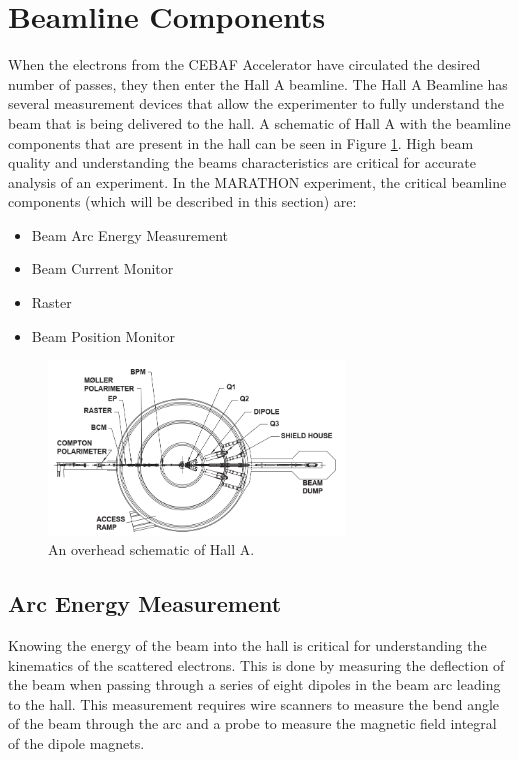 \section{Beamline Components}

When the electrons from the CEBAF Accelerator have circulated the desired number of passes, they then enter the Hall A beamline. The Hall A Beamline has several measurement devices that allow the experimenter to fully understand the beam that is being delivered to the hall. A schematic of Hall A with the beamline components that are present in the hall can be seen in Figure \ref{fig:ha_overhead}. High beam quality and understanding the beams characteristics are critical for accurate analysis of an experiment. In the MARATHON experiment, the critical beamline components (which will be described in this section) are:

\begin{itemize}
	\item Beam Arc Energy Measurement
	\item Beam Current Monitor
	\item Raster
	\item Beam Position Monitor
\end{itemize}

\begin{figure}[h]
\begin{center}
	\includegraphics[width=0.7\textwidth]{./setup/fig/HallA_overhead.png}
	\caption{An overhead schematic of Hall A.\cite{HANIM}}
	\label{fig:ha_overhead}
\end{center}
\end{figure}

\subsection{Arc Energy Measurement}

Knowing the energy of the beam into the hall is critical for understanding the kinematics of the scattered electrons. This is done by measuring the deflection of the beam when passing through a series of eight dipoles in the beam arc leading to the hall. This measurement requires wire scanners to measure the bend angle of the beam through the arc and a probe to measure the magnetic field integral of the dipole magnets. 

